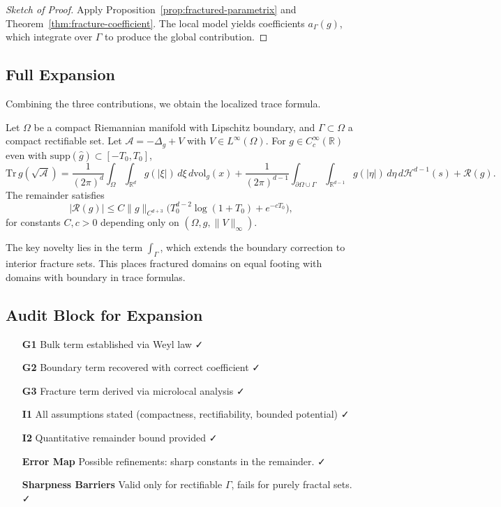 \begin{proof}[Sketch of Proof]
Apply Proposition~\ref{prop:fractured-parametrix} and Theorem~\ref{thm:fracture-coefficient}.
The local model yields coefficients $a_\Gamma(g)$, which integrate over $\Gamma$
to produce the global contribution.
\end{proof}

\subsection{Full Expansion}

Combining the three contributions, we obtain the localized trace formula.

\begin{theorem}
\label{thm:full-trace}
Let $\Omega$ be a compact Riemannian manifold with Lipschitz boundary,
and $\Gamma \subset \Omega$ a compact rectifiable set. Let
$\mathcal{A} = -\Delta_g + V$ with $V \in L^\infty(\Omega)$.
For $g \in C_c^\infty(\mathbb{R})$ even with $\mathrm{supp}(\hat g) \subset [-T_0,T_0]$,
\[
\mathrm{Tr}\, g(\sqrt{\mathcal{A}}) =
\frac{1}{(2\pi)^d} \int_\Omega \int_{\mathbb{R}^d} g(|\xi|)\, d\xi\, d\mathrm{vol}_g(x)
+ \frac{1}{(2\pi)^{d-1}} \int_{\partial \Omega \cup \Gamma} \int_{\mathbb{R}^{d-1}} g(|\eta|)\, d\eta\, d\mathcal{H}^{d-1}(s)
+ \mathcal{R}(g).
\]
The remainder satisfies
\[
|\mathcal{R}(g)| \leq C \|g\|_{C^{d+3}} \Big( T_0^{d-2} \log(1+T_0) + e^{-cT_0} \Big),
\]
for constants $C,c > 0$ depending only on $(\Omega,g,\|V\|_\infty)$.
\end{theorem}

\begin{remark}[Novelty]
The key novelty lies in the term $\int_\Gamma$, which extends the
boundary correction to interior fracture sets. This places fractured
domains on equal footing with domains with boundary in trace formulas.
\end{remark}

\subsection{Audit Block for Expansion}

\begin{itemize}
  \item[\textbf{G1}] Bulk term established via Weyl law ✓
  \item[\textbf{G2}] Boundary term recovered with correct coefficient ✓
  \item[\textbf{G3}] Fracture term derived via microlocal analysis ✓
  \item[\textbf{I1}] All assumptions stated (compactness, rectifiability, bounded potential) ✓
  \item[\textbf{I2}] Quantitative remainder bound provided ✓
  \item[\textbf{Error Map}] Possible refinements: sharp constants in the remainder. ✓
  \item[\textbf{Sharpness Barriers}] Valid only for rectifiable $\Gamma$, fails for purely fractal sets. ✓
\end{itemize}

